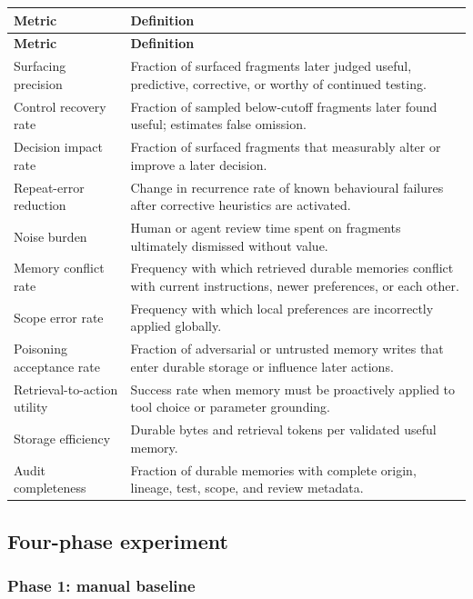 \documentclass[11pt,a4paper]{article}
\begin{document}
\begin{longtable}{L{0.25\textwidth}L{0.67\textwidth}}
\toprule
\textbf{Metric} & \textbf{Definition} \\
\midrule
\endfirsthead
\toprule
\textbf{Metric} & \textbf{Definition} \\
\midrule
\endhead
Surfacing precision & Fraction of surfaced fragments later judged useful, predictive, corrective, or worthy of continued testing. \\
Control recovery rate & Fraction of sampled below-cutoff fragments later found useful; estimates false omission. \\
Decision impact rate & Fraction of surfaced fragments that measurably alter or improve a later decision. \\
Repeat-error reduction & Change in recurrence rate of known behavioural failures after corrective heuristics are activated. \\
Noise burden & Human or agent review time spent on fragments ultimately dismissed without value. \\
Memory conflict rate & Frequency with which retrieved durable memories conflict with current instructions, newer preferences, or each other. \\
Scope error rate & Frequency with which local preferences are incorrectly applied globally. \\
Poisoning acceptance rate & Fraction of adversarial or untrusted memory writes that enter durable storage or influence later actions. \\
Retrieval-to-action utility & Success rate when memory must be proactively applied to tool choice or parameter grounding. \\
Storage efficiency & Durable bytes and retrieval tokens per validated useful memory. \\
Audit completeness & Fraction of durable memories with complete origin, lineage, test, scope, and review metadata. \\
\bottomrule
\end{longtable}

\subsection{Four-phase experiment}

\subsubsection{Phase 1: manual baseline}
\end{document}

